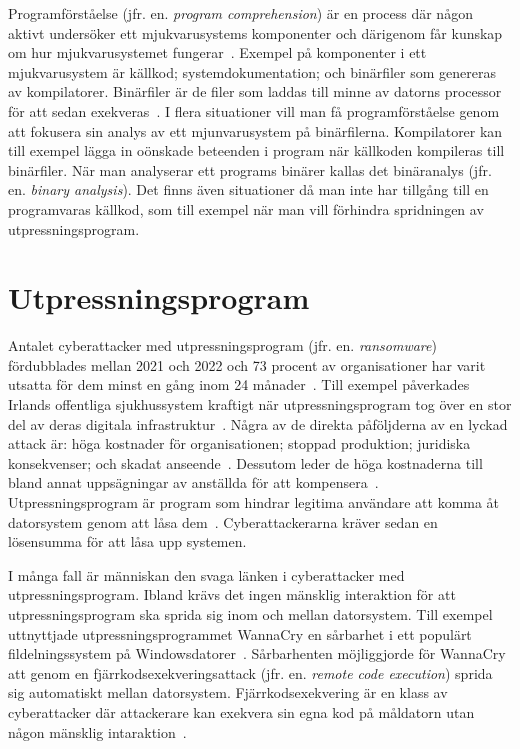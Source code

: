 Programförståelse (jfr. en. \emph{program comprehension}) är en process där någon aktivt undersöker ett mjukvarusystems komponenter och därigenom får kunskap om hur mjukvarusystemet fungerar~\cite{xia2017}.
Exempel på komponenter i ett mjukvarusystem är källkod; systemdokumentation; och binärfiler som genereras av kompilatorer.
Binärfiler är de filer som laddas till minne av datorns processor för att sedan exekveras~\cite{andriesse2018}.
I flera situationer vill man få programförståelse genom att fokusera sin analys av ett mjunvarusystem på binärfilerna.
Kompilatorer kan till exempel lägga in oönskade beteenden i program när källkoden kompileras till binärfiler.
När man analyserar ett programs binärer kallas det binäranalys (jfr. en. \emph{binary analysis}).
Det finns även situationer då man inte har tillgång till en programvaras källkod, som till exempel när man vill förhindra spridningen av utpressningsprogram.

\section{Utpressningsprogram}

Antalet cyberattacker med utpressningsprogram (jfr. en. \emph{ransomware}) fördubblades mellan 2021 och 2022 och 73 procent av organisationer har varit utsatta för dem minst en gång inom 24 månader~\cite{cyberreason2021, cyberreason2022}.
Till exempel påverkades Irlands offentliga sjukhussystem kraftigt när utpressningsprogram tog över en stor del av deras digitala infrastruktur~\cite{hse_report, gallagher2023}.
Några av de direkta påföljderna av en lyckad attack är: höga kostnader för organisationen; stoppad produktion; juridiska konsekvenser; och skadat anseende~\cite{cyberreason2021, cyberreason2022}.
Dessutom leder de höga kostnaderna till bland annat uppsägningar av anställda för att kompensera~\cite{cyberreason2021, cyberreason2022}.
Utpressningsprogram är program som hindrar legitima användare att komma åt datorsystem genom att låsa dem~\cite{accessscience_computer_virus}.
Cyberattackerarna kräver sedan en lösensumma för att låsa upp systemen.

I många fall är människan den svaga länken i cyberattacker med utpressningsprogram.
Ibland krävs det ingen mänsklig interaktion för att utpressningsprogram ska sprida sig inom och mellan datorsystem.
Till exempel uttnyttjade utpressningsprogrammet WannaCry en sårbarhet i ett populärt fildelningssystem på Windowsdatorer~\cite{alraddadicomprehensive}.
Sårbarhenten möjliggjorde för WannaCry att genom en fjärrkodsexekveringsattack (jfr. en. \emph{remote code execution}) sprida sig automatiskt mellan datorsystem.
Fjärrkodsexekvering är en klass av cyberattacker där attackerare kan exekvera sin egna kod på måldatorn utan någon mänsklig intaraktion~\cite{baker2022}.

